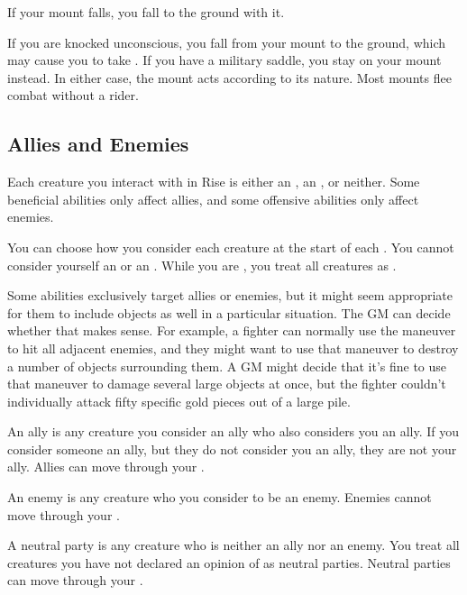      If your mount falls, you fall to the ground with it.

     If you are knocked unconscious, you fall from your mount to the ground, which may cause you to take .
    If you have a military saddle, you stay on your mount instead.
    In either case, the mount acts according to its nature.
    Most mounts flee combat without a rider.

  \subsection{Allies and Enemies}\label{Allies and Enemies}
    Each creature you interact with in Rise is either an , an , or neither.
    Some beneficial abilities only affect allies, and some offensive abilities only affect enemies.

    You can choose how you consider each creature at the start of each .
    You cannot consider yourself an  or an .
    While you are \unconscious, you treat all creatures as .

    Some abilities exclusively target allies or enemies, but it might seem appropriate for them to include objects as well in a particular situation.
    The GM can decide whether that makes sense.
    For example, a fighter can normally use the  maneuver to hit all adjacent enemies, and they might want to use that maneuver to destroy a number of objects surrounding them.
    A GM might decide that it's fine to use that maneuver to damage several large objects at once, but the fighter couldn't individually attack fifty specific gold pieces out of a large pile.

     An ally is any creature you consider an ally who also considers you an ally.
    If you consider someone an ally, but they do not consider you an ally, they are not your ally.
    Allies can move through your .

     An enemy is any creature who you consider to be an enemy.
    Enemies cannot move through your .

     A neutral party is any creature who is neither an ally nor an enemy.
    You treat all creatures you have not declared an opinion of as neutral parties.
    Neutral parties can move through your .

